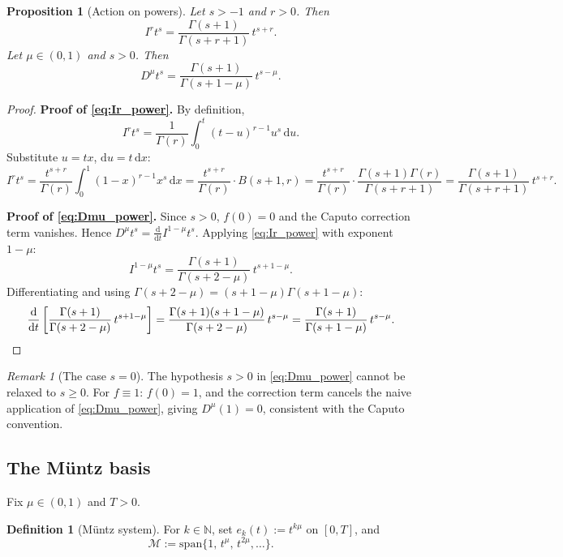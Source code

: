 \documentclass[12pt,a4paper]{amsart}
\newcommand{\dd}{\mathrm{d}}
\newcommand{\N}{\mathbb{N}}
\newcommand{\assign}{:=}
\theoremstyle{plain}
\newtheorem{proposition}[theorem]{Proposition}
\theoremstyle{definition}
\newtheorem{definition}[theorem]{Definition}
\theoremstyle{remark}
\newtheorem{remark}[theorem]{Remark}
\begin{document}
\begin{proposition}[Action on powers]\label{prop:powers}
Let $s>-1$ and $r>0$. Then
\begin{equation}\label{eq:Ir_power}
  I^r t^s = \frac{\Gamma(s+1)}{\Gamma(s+r+1)}\,t^{s+r}.
\end{equation}
Let $\mu\in(0,1)$ and $s>0$. Then
\begin{equation}\label{eq:Dmu_power}
  D^{\mu}t^s = \frac{\Gamma(s+1)}{\Gamma(s+1-\mu)}\,t^{s-\mu}.
\end{equation}
\end{proposition}

\begin{proof}
\textbf{Proof of \eqref{eq:Ir_power}.}
By definition,
\[
  I^r t^s = \frac{1}{\Gamma(r)}\int_0^t(t-u)^{r-1}u^s\,\dd u.
\]
Substitute $u=tx$, $\dd u=t\,\dd x$:
\[
  I^r t^s
  = \frac{t^{s+r}}{\Gamma(r)}\int_0^1(1-x)^{r-1}x^s\,\dd x
  = \frac{t^{s+r}}{\Gamma(r)}\cdot B(s+1,r)
  = \frac{t^{s+r}}{\Gamma(r)}\cdot\frac{\Gamma(s+1)\Gamma(r)}{\Gamma(s+r+1)}
  = \frac{\Gamma(s+1)}{\Gamma(s+r+1)}\,t^{s+r}.
\]

\textbf{Proof of \eqref{eq:Dmu_power}.}
Since $s>0$, $f(0)=0$ and the Caputo correction term vanishes.
Hence $D^{\mu}t^s = \frac{\dd}{\dd t}I^{1-\mu}t^s$.
Applying \eqref{eq:Ir_power} with exponent $1-\mu$:
\[
  I^{1-\mu}t^s = \frac{\Gamma(s+1)}{\Gamma(s+2-\mu)}\,t^{s+1-\mu}.
\]
Differentiating and using $\Gamma(s+2-\mu)=(s+1-\mu)\Gamma(s+1-\mu)$:
\[
  \frac{\dd}{\dd t}\left[\frac{\Gamma(s+1)}{\Gamma(s+2-\mu)}\,t^{s+1-\mu}\right]
  = \frac{\Gamma(s+1)(s+1-\mu)}{\Gamma(s+2-\mu)}\,t^{s-\mu}
  = \frac{\Gamma(s+1)}{\Gamma(s+1-\mu)}\,t^{s-\mu}.\qedhere
\]
\end{proof}

\begin{remark}[The case $s=0$]\label{rem:Dmu_const}
The hypothesis $s>0$ in \eqref{eq:Dmu_power} cannot be relaxed to $s\ge 0$.
For $f\equiv 1$: $f(0)=1$, and the correction term cancels the naive
application of \eqref{eq:Dmu_power}, giving $D^{\mu}(1)=0$, consistent with
the Caputo convention.
\end{remark}

\subsection{The M\"untz basis}

Fix $\mu\in(0,1)$ and $T>0$.

\begin{definition}[M\"untz system]\label{def:muntz}
For $k\in\N$, set $e_k(t)\assign t^{k\mu}$ on $[0,T]$, and
\[
  \mathcal{M}\assign\mathrm{span}\{1,\,t^{\mu},\,t^{2\mu},\ldots\}.
\]
\end{definition}
\end{document}
